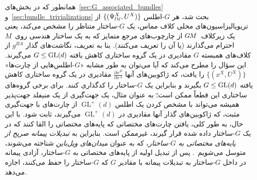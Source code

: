 همانطور که در بخش‌های~\ref{sec:G_associated_bundles} و~\ref{sec:bundle_trivializations} بحث شد، هر $G$-اطلس $\{(\PsiTM^X, U^X)\}$ از تریویالیزاسیون‌های محلی کلاف مماس، یک $G$-ساختار متناظر را مشخص می‌کند، یعنی یک زیرکلاف~$G\mkern-1.4muM$ از چارچوب‌های مرجع متمایز که به یک ساختار هندسی روی~$M$ احترام می‌گذارند (یا آن را تعریف می‌کنند).
بنا به تعریف، نگاشت‌های گذار $g^{BA}$ از کلاف‌های همبسته $G$ مقادیری در یک گروه ساختاری کاهش یافته $G\leq\operatorname{GL}(d)$ می‌گیرند.
این سؤال را مطرح می‌کند که آیا می‌توان به طور مشابه «$G$-اطلس‌هایی از چارت‌ها» $\{(x^X, U^X)\}$ را یافت، که ژاکوبین‌های آنها $\frac{\partial x^B}{\partial x^A}$ مقادیری در یک گروه ساختاری کاهش یافته $G \leq \operatorname{GL}(d)$ بگیرند و بنابراین یک $G$-ساختار را کدگذاری کنند.
برای برخی گروه‌های ساختاری این قطعاً ممکن است؛ به عنوان مثال، یک جهت‌گیری از یک منیفلد جهت‌پذیر همیشه می‌تواند با مشخص کردن یک اطلس $\operatorname{GL}^+(d)$ از چارت‌های با جهت‌گیری مثبت، که ژاکوبین‌های گذار آنها مقادیری در $\operatorname{GL}^+(d)$ می‌گیرند، ثابت شود.
با این حال، به طور کلی، یافتن چارت‌های مختصاتی که پایه‌های مختصاتی را القا کنند که در یک $G$-ساختار داده شده قرار گیرند، غیرممکن است.
بنابراین به \emph{تبدیلات پیمانه صریح از پایه‌های مختصاتی به $G$-ساختار}، که به عنوان \emph{میدان‌های ویل‌باین} شناخته می‌شوند، متوسل می‌شویم~\cite{yepez2011einstein, zhou2016gauge, nakahara2003geometry, carroll2004spacetime}.
پس از تبدیل اولیه از پایه‌های مختصاتی به $G$-ساختار، آزادی پیمانه در داخل $G$-ساختار به تبدیلات پیمانه با مقادیر $G$ که $G$-ساختار را حفظ می‌کنند، اجازه می‌دهد.


